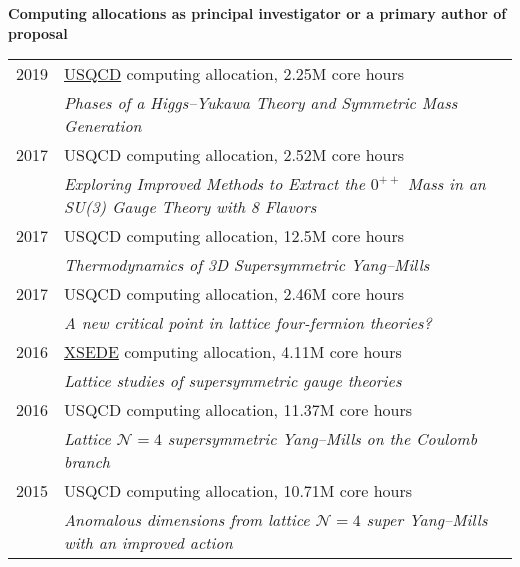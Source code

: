 \begin{spacelist}
  \vspace{18 pt}
  \item {\large \bfseries Computing allocations as principal investigator or a primary author of proposal} \\[10 pt]
    \begin{tabular}[t]{cl}
      2019 & \href{http://www.usqcd.org}{USQCD} computing allocation, 2.25M core hours                                \\ %
           & \textit{Phases of a Higgs--Yukawa Theory and Symmetric Mass Generation}                                  \\[6 pt]
      2017 & USQCD computing allocation, 2.52M core hours                                                             \\ %
           & \textit{Exploring Improved Methods to Extract the $0^{++}$ Mass in an SU(3) Gauge Theory with 8 Flavors} \\[6 pt]
      2017 & USQCD computing allocation, 12.5M core hours                                                             \\ %
           & \textit{Thermodynamics of 3D Supersymmetric Yang--Mills}                                                 \\[6 pt]
      2017 & USQCD computing allocation, 2.46M core hours                                                             \\ %
           & \textit{A new critical point in lattice four-fermion theories?}                                          \\[6 pt]
      2016 & \href{http://www.xsede.org}{XSEDE} computing allocation, 4.11M core hours                                \\ %
           & \textit{Lattice studies of supersymmetric gauge theories}                                                \\[6 pt]
      2016 & USQCD computing allocation, 11.37M core hours                                                            \\ %
           & \textit{Lattice $\mathcal N = 4$ supersymmetric Yang--Mills on the Coulomb branch}                       \\[6 pt]
      2015 & USQCD computing allocation, 10.71M core hours                                                            \\ %
           & \textit{Anomalous dimensions from lattice $\mathcal N = 4$ super Yang--Mills with an improved action}    \\[6 pt]

\end{tabular}
\end{spacelist}
